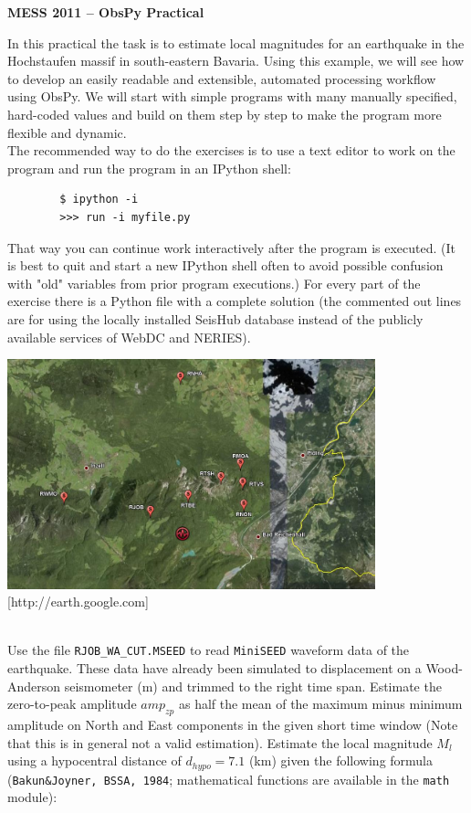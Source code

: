 \documentclass{LMUexercise}
\begin{document}
%
%
%
\vspace*{1cm}
\begin{center}
\textbf{\Large MESS 2011 -- ObsPy Practical}
\end{center}
%
%
In this practical the task is to estimate local magnitudes for an earthquake in
the Hochstaufen massif in south-eastern Bavaria. Using this example, we will
see how to develop an easily readable and extensible, automated processing
workflow using ObsPy. We will start with simple programs with many manually
specified, hard-coded values and build on them step by step to make the program
more flexible and dynamic.\\
The recommended way to do the exercises is to use a text editor to work on the
program and run the program in an IPython shell:
\begin{verbatim}
        $ ipython -i
        >>> run -i myfile.py
\end{verbatim}
That way you can continue work interactively after the program is executed. (It
is best to quit and start a new IPython shell often to avoid possible confusion
with "old" variables from prior program executions.) For every part of the
exercise there is a Python file with a complete solution (the commented out
lines are for using the locally installed SeisHub database instead of the
publicly available services of WebDC and NERIES). 
\vspace*{1.2em}

\begin{center}
\includegraphics[width=0.8\textwidth]{rh.jpg}
\\[-1ex]{\tiny [http://earth.google.com]}
\end{center}
\vspace*{1.2em}

\\
Use the file \verb#RJOB_WA_CUT.MSEED# to read \verb#MiniSEED# waveform data of
the earthquake. These data have already been simulated to displacement on a
Wood-Anderson seismometer (m) and trimmed to the right time span. Estimate the
zero-to-peak amplitude $amp_{zp}$ as half the mean of the maximum minus minimum
amplitude on North and East components in the given short time window (Note
that this is in general not a valid estimation). Estimate the local magnitude
$M_l$ using a hypocentral distance of $d_{hypo}=7.1$ (km) given the following
formula (\verb#Bakun&Joyner, BSSA, 1984#; mathematical functions are available
in the \verb#math# module):
\end{document}
